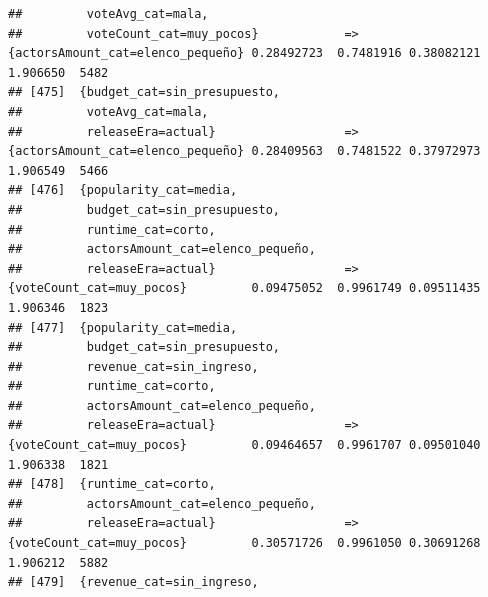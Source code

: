 \documentclass[
]{article}
\begin{document}
\begin{verbatim}
##         voteAvg_cat=mala,                                                                                                       
##         voteCount_cat=muy_pocos}            => {actorsAmount_cat=elenco_pequeño} 0.28492723  0.7481916 0.38082121 1.906650  5482
## [475]  {budget_cat=sin_presupuesto,                                                                                             
##         voteAvg_cat=mala,                                                                                                       
##         releaseEra=actual}                  => {actorsAmount_cat=elenco_pequeño} 0.28409563  0.7481522 0.37972973 1.906549  5466
## [476]  {popularity_cat=media,                                                                                                   
##         budget_cat=sin_presupuesto,                                                                                             
##         runtime_cat=corto,                                                                                                      
##         actorsAmount_cat=elenco_pequeño,                                                                                        
##         releaseEra=actual}                  => {voteCount_cat=muy_pocos}         0.09475052  0.9961749 0.09511435 1.906346  1823
## [477]  {popularity_cat=media,                                                                                                   
##         budget_cat=sin_presupuesto,                                                                                             
##         revenue_cat=sin_ingreso,                                                                                                
##         runtime_cat=corto,                                                                                                      
##         actorsAmount_cat=elenco_pequeño,                                                                                        
##         releaseEra=actual}                  => {voteCount_cat=muy_pocos}         0.09464657  0.9961707 0.09501040 1.906338  1821
## [478]  {runtime_cat=corto,                                                                                                      
##         actorsAmount_cat=elenco_pequeño,                                                                                        
##         releaseEra=actual}                  => {voteCount_cat=muy_pocos}         0.30571726  0.9961050 0.30691268 1.906212  5882
## [479]  {revenue_cat=sin_ingreso,                                                                                                

\end{verbatim}
\end{document}
